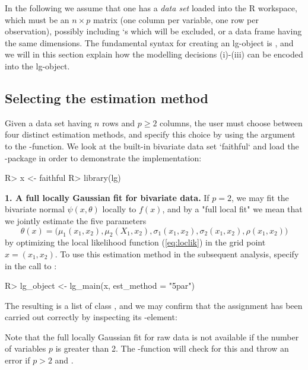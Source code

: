 In the following we assume that one has a \emph{data set}  loaded into the R workspace, which must be an $n\times p$ matrix (one column per variable, one row per observation), possibly including `s which will be excluded, or a data frame having the same dimensions. The fundamental syntax for creating an lg-object is , and we will in this section explain how the modelling decisions (i)-(iii) can be encoded into the lg-object.

\subsection{Selecting the estimation method}
\label{chap:est-method}

Given a data set  having $n$ rows and $p \geq 2$ columns, the user must choose between four distinct estimation methods, and specify this choice by using the argument  to the -function. We look at the built-in bivariate data set `faithful` and load the -package in order to demonstrate the implementation:

\begin{example}
R> x <- faithful
R> library(lg)
\end{example}

\textbf{1. A full locally Gaussian fit for bivariate data.} If $p = 2$, we may fit the bivariate normal $\psi(x, \theta)$ locally to $f(x)$, and by a "full local fit" we mean that we jointly estimate the five parameters
$$\theta(x) = \big(\mu_1(x_1, x_2), \mu_2(X_1, x_2), \sigma_1(x_1, x_2), \sigma_2(x_1,x_2),\rho(x_1, x_2)\big)$$
by optimizing the local likelihood function (\ref{eq:loclik}) in the grid point $x = (x_1, x_2)$. To use this estimation method in the subsequent analysis, specify  in the call to :

\begin{example}
R> lg_object <- lg_main(x, est_method = "5par")
\end{example}
The resulting  is a list of class , and we may confirm that the assignment has been carried out correctly by inspecting its -element:

Note that the full locally Gaussian fit for raw data is not available if the number of variables $p$ is greater than 2. The -function will check for this and throw an error if $p>2$ and .

